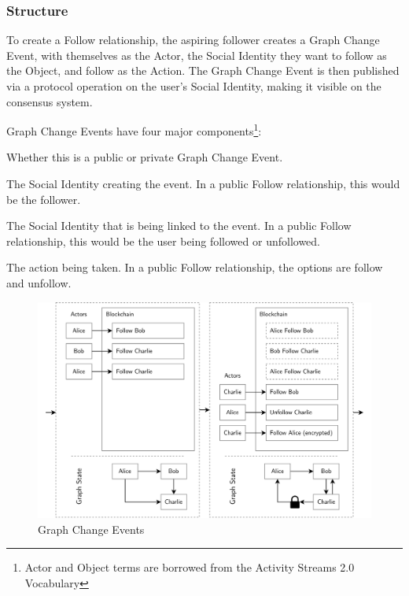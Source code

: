 \documentclass[12pt,letterpaper]{article}
\providecommand{\tightlist}{%
\setlength{\itemsep}{0pt}\setlength{\parskip}{0pt}}
\begin{document}
\subsubsection{Structure}

To create a Follow relationship, the aspiring follower creates a Graph Change Event, with
themselves as the Actor, the Social Identity they want to follow as the Object, and follow
as the Action. The Graph Change Event is then published via a protocol operation on the
user's Social Identity, making it visible on the consensus system.

\begin{samepage}
	Graph Change Events have four major components\footnote{Actor and Object terms are borrowed from the Activity Streams 2.0 Vocabulary\cite{activitypub}}:

	\begin{description}
		\tightlist
		\item[Type:]
		      Whether this is a public or private Graph Change Event.
		\item[Actor:]
		      The Social Identity creating the event. In a public Follow relationship, this would be the follower.
		\item[Object:]
		      The Social Identity that is being linked to the event. In a public Follow relationship, this would be the user being followed or unfollowed.
		\item[Action:]
		      The action being taken. In a public Follow relationship, the options are follow and unfollow.
	\end{description}
\end{samepage}

\begin{figure}
	\includegraphics[width=\linewidth]{figures/Graph Change Events.png}
	\caption{Graph Change Events}
	\label{fig:3}
\end{figure}
\end{document}
